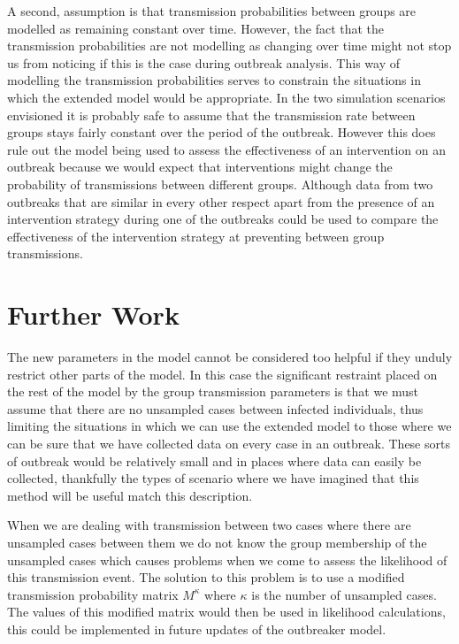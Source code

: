\documentclass[11pt,a4paper]{report}
\begin{document}
A second, assumption is that transmission probabilities between groups are modelled as remaining constant over time. However, the fact that the transmission probabilities are not modelling as changing over time might not stop us from noticing if this is the case during outbreak analysis. This way of modelling the transmission probabilities serves to constrain the situations in which the extended model would be appropriate. In the two simulation scenarios envisioned it is probably safe to assume that the transmission rate between groups stays fairly constant over the period of the outbreak. However this does rule out the model being used to assess the effectiveness of an intervention on an outbreak because we would expect that interventions might change the probability of transmissions between different groups. Although data from two outbreaks that are similar in every other respect apart from the presence of an intervention strategy during one of the outbreaks could be used to compare the effectiveness of the intervention strategy at preventing between group transmissions.


\section{Further Work}
The new parameters in the model cannot be considered too helpful if they unduly restrict other parts of the model. In this case the significant restraint placed on the rest of the model by the group transmission parameters is that we must assume that there are no unsampled cases between infected individuals, thus limiting the situations in which we can use the extended model to those where we can be sure that we have collected data on every case in an outbreak. These sorts of outbreak would be relatively small and in places where data can easily be collected, thankfully the types of scenario where we have imagined that this method will be useful match this description.

When we are dealing with transmission between two cases where there are unsampled cases between them we do not know the group membership of the unsampled cases which causes problems when we come to assess the likelihood of this transmission event. The solution to this problem is to use a modified transmission probability matrix $M^{\kappa}$ where $\kappa$ is the number of unsampled cases. The values of this modified matrix would then be used in likelihood calculations, this could be implemented in future updates of the outbreaker model.





\end{document}
